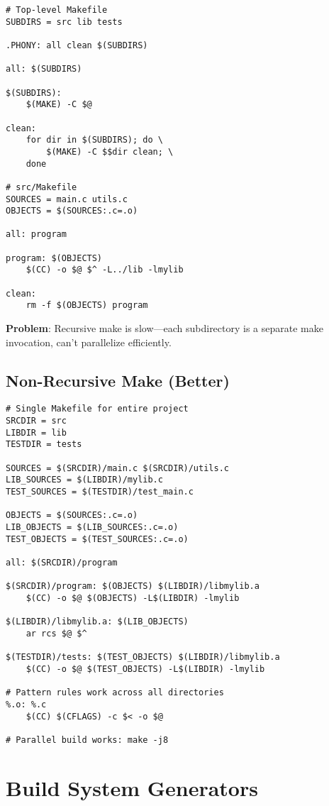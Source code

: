\begin{lstlisting}
# Top-level Makefile
SUBDIRS = src lib tests

.PHONY: all clean $(SUBDIRS)

all: $(SUBDIRS)

$(SUBDIRS):
	$(MAKE) -C $@

clean:
	for dir in $(SUBDIRS); do \
		$(MAKE) -C $$dir clean; \
	done

# src/Makefile
SOURCES = main.c utils.c
OBJECTS = $(SOURCES:.c=.o)

all: program

program: $(OBJECTS)
	$(CC) -o $@ $^ -L../lib -lmylib

clean:
	rm -f $(OBJECTS) program
\end{lstlisting}

\textbf{Problem}: Recursive make is slow—each subdirectory is a separate make invocation, can't parallelize efficiently.

\subsection{Non-Recursive Make (Better)}

\begin{lstlisting}
# Single Makefile for entire project
SRCDIR = src
LIBDIR = lib
TESTDIR = tests

SOURCES = $(SRCDIR)/main.c $(SRCDIR)/utils.c
LIB_SOURCES = $(LIBDIR)/mylib.c
TEST_SOURCES = $(TESTDIR)/test_main.c

OBJECTS = $(SOURCES:.c=.o)
LIB_OBJECTS = $(LIB_SOURCES:.c=.o)
TEST_OBJECTS = $(TEST_SOURCES:.c=.o)

all: $(SRCDIR)/program

$(SRCDIR)/program: $(OBJECTS) $(LIBDIR)/libmylib.a
	$(CC) -o $@ $(OBJECTS) -L$(LIBDIR) -lmylib

$(LIBDIR)/libmylib.a: $(LIB_OBJECTS)
	ar rcs $@ $^

$(TESTDIR)/tests: $(TEST_OBJECTS) $(LIBDIR)/libmylib.a
	$(CC) -o $@ $(TEST_OBJECTS) -L$(LIBDIR) -lmylib

# Pattern rules work across all directories
%.o: %.c
	$(CC) $(CFLAGS) -c $< -o $@

# Parallel build works: make -j8
\end{lstlisting}

\section{Build System Generators}

